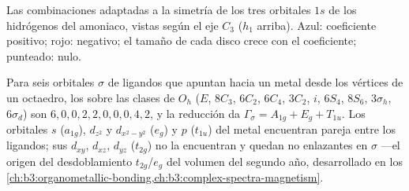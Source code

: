 \begin{omfigure}

{\small Las combinaciones adaptadas a la simetría de los tres orbitales $1s$ de los hidrógenos
del amoniaco, vistas según el eje $C_3$ ($h_1$ arriba). Azul: coeficiente
positivo; rojo: negativo; el tamaño de cada disco crece con el
coeficiente; punteado: nulo.}
\end{omfigure}

\begin{example}\label{ex:b3:group-theory-applied:ml6}
Para seis orbitales $\sigma$ de ligandos que apuntan hacia un metal desde los vértices de un
octaedro, los  sobre las clases de $O_h$ ($E$, $8C_3$, $6C_2$, $6C_4$,
$3C_2$, $i$, $6S_4$, $8S_6$, $3\sigma_h$, $6\sigma_d$) son $6, 0, 0, 2, 2, 0, 0, 0, 4,
2$, y la reducción da $\Gamma_\sigma = A_{1g} + E_g + T_{1u}$. Los orbitales $s$
($a_{1g}$), $d_{z^2}$ y $d_{x^2-y^2}$ ($e_g$) y $p$ ($t_{1u}$) del metal encuentran
pareja entre los ligandos; sus $d_{xy}$, $d_{xz}$, $d_{yz}$ ($t_{2g}$) no la encuentran y quedan no enlazantes
en $\sigma$ ---el origen del desdoblamiento $t_{2g}$/$e_g$ del volumen del segundo año,
desarrollado en los \cref{ch:b3:organometallic-bonding,ch:b3:complex-spectra-magnetism}.
\end{example}

